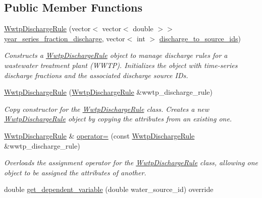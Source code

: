 \subsection*{Public Member Functions}
\begin{DoxyCompactItemize}
\item 
\mbox{\hyperlink{classWwtpDischargeRule_ae904657855c9d983ea0e5995109cd561}{Wwtp\+Discharge\+Rule}} (vector$<$ vector$<$ double $>$$>$ \mbox{\hyperlink{classWwtpDischargeRule_a5d193e0cbc2eb23e1b86e79fb2eafad3}{year\+\_\+series\+\_\+fraction\+\_\+discharge}}, vector$<$ int $>$ \mbox{\hyperlink{classWwtpDischargeRule_ac2f77a9fca93eef3fd26ff1d579130be}{discharge\+\_\+to\+\_\+source\+\_\+ids}})
\begin{DoxyCompactList}\small\item\em Constructs a {\ttfamily \mbox{\hyperlink{classWwtpDischargeRule}{Wwtp\+Discharge\+Rule}}} object to manage discharge rules for a wastewater treatment plant (W\+W\+TP). Initializes the object with time-\/series discharge fractions and the associated discharge source I\+Ds. \end{DoxyCompactList}\item 
\mbox{\hyperlink{classWwtpDischargeRule_ac433e50df1414ba4bbb40022832b43ff}{Wwtp\+Discharge\+Rule}} (\mbox{\hyperlink{classWwtpDischargeRule}{Wwtp\+Discharge\+Rule}} \&wwtp\+\_\+discharge\+\_\+rule)
\begin{DoxyCompactList}\small\item\em Copy constructor for the {\ttfamily \mbox{\hyperlink{classWwtpDischargeRule}{Wwtp\+Discharge\+Rule}}} class. Creates a new {\ttfamily \mbox{\hyperlink{classWwtpDischargeRule}{Wwtp\+Discharge\+Rule}}} object by copying the attributes from an existing one. \end{DoxyCompactList}\item 
\mbox{\hyperlink{classWwtpDischargeRule}{Wwtp\+Discharge\+Rule}} \& \mbox{\hyperlink{classWwtpDischargeRule_a59b2b1f56607106a237011f16a3915c3}{operator=}} (const \mbox{\hyperlink{classWwtpDischargeRule}{Wwtp\+Discharge\+Rule}} \&wwtp\+\_\+discharge\+\_\+rule)
\begin{DoxyCompactList}\small\item\em Overloads the assignment operator for the {\ttfamily \mbox{\hyperlink{classWwtpDischargeRule}{Wwtp\+Discharge\+Rule}}} class, allowing one object to be assigned the attributes of another. \end{DoxyCompactList}\item 
double \mbox{\hyperlink{classWwtpDischargeRule_a4cea07bf746d200c9ca3018405a77a46}{get\+\_\+dependent\+\_\+variable}} (double water\+\_\+source\+\_\+id) override
$$
\end{DoxyCompactItemize}
